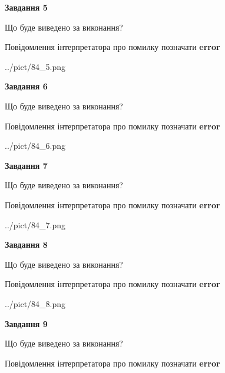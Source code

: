 \documentclass[11pt, ukrainian]{article}
\begin{document}
{\begin {large}
{\begin {center}\textbf{Завдання 5}\end {center}}\par
Що буде виведено за виконання? \par
Повідомлення інтерпретатора про помилку позначати \textbf{error}

\begin{center}
	{../pict/84_5.png}
\end{center}
\newpage

{\begin {center}\textbf{Завдання 6}\end {center}}\par
Що буде виведено за виконання? \par
Повідомлення інтерпретатора про помилку позначати \textbf{error}

\begin{center}
	{../pict/84_6.png}
\end{center}
\newpage

{\begin {center}\textbf{Завдання 7}\end {center}}\par
Що буде виведено за виконання? \par
Повідомлення інтерпретатора про помилку позначати \textbf{error}

\begin{center}
	{../pict/84_7.png}
\end{center}
\newpage

{\begin {center}\textbf{Завдання 8}\end {center}}\par
Що буде виведено за виконання? \par
Повідомлення інтерпретатора про помилку позначати \textbf{error}

\begin{center}
	{../pict/84_8.png}
\end{center}
\newpage

{\begin {center}\textbf{Завдання 9}\end {center}}\par
Що буде виведено за виконання? \par
Повідомлення інтерпретатора про помилку позначати \textbf{error}


\end{large}}
\end{document}
